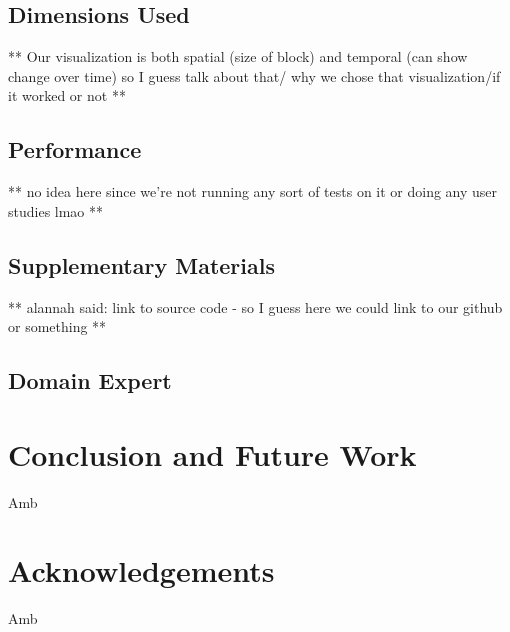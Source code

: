 \documentclass[journal]{vgtc}                %
\begin{document}
\subsection{Dimensions Used}

** Our visualization is both spatial (size of block) and temporal (can show change over time) so I guess talk about that/
why we chose that visualization/if it worked or not **

\subsection{Performance}

** no idea here since we're not running any sort of tests on it or doing any user studies lmao **

\subsection{Supplementary Materials}
** alannah said: link to source code - so I guess here we could link to our github or something **

\subsection{Domain Expert}

\section{Conclusion and Future Work}

Amb

\section{Acknowledgements}

Amb
\end{document}
